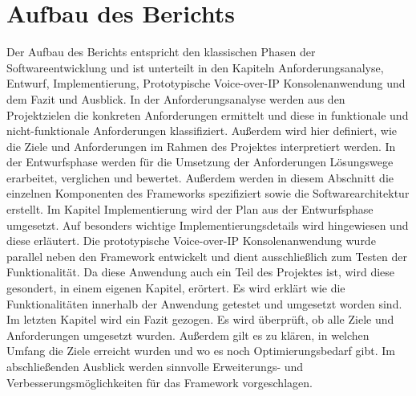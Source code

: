 \section{Aufbau des Berichts}
Der Aufbau des Berichts entspricht den klassischen Phasen der Softwareentwicklung und ist unterteilt in den Kapiteln Anforderungsanalyse, Entwurf, Implementierung, Prototypische Voice-over-IP Konsolenanwendung und dem Fazit und Ausblick. 
In der Anforderungsanalyse werden aus den Projektzielen die konkreten Anforderungen ermittelt und diese in funktionale und nicht-funktionale Anforderungen klassifiziert. Außerdem wird hier definiert, wie die Ziele und Anforderungen im Rahmen des Projektes interpretiert werden.
In der Entwurfsphase werden für die Umsetzung der Anforderungen Lösungswege erarbeitet, verglichen und bewertet. Außerdem werden in diesem Abschnitt die einzelnen Komponenten des Frameworks spezifiziert sowie die Softwarearchitektur erstellt.
Im Kapitel Implementierung wird der Plan aus der Entwurfsphase umgesetzt. Auf besonders wichtige Implementierungsdetails wird hingewiesen und diese erläutert. 
Die prototypische Voice-over-IP Konsolenanwendung wurde parallel neben den Framework entwickelt und dient ausschließlich zum Testen der Funktionalität. Da diese Anwendung auch ein Teil des Projektes ist, wird diese gesondert, in einem eigenen Kapitel, erörtert. Es wird erklärt wie die Funktionalitäten innerhalb der Anwendung getestet und umgesetzt worden sind.
Im letzten Kapitel wird ein Fazit gezogen. Es wird überprüft, ob alle Ziele und Anforderungen umgesetzt wurden. Außerdem gilt es zu klären, in welchen Umfang die Ziele erreicht wurden und wo es noch Optimierungsbedarf gibt. Im abschließenden Ausblick werden sinnvolle Erweiterungs- und Verbesserungsmöglichkeiten für das Framework vorgeschlagen.
	
